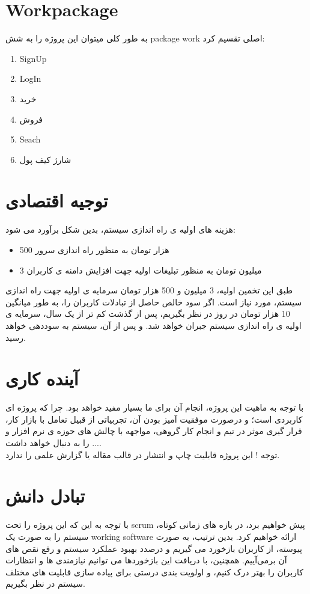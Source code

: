 \documentclass{article}
\begin{document}
	\section{Workpackage}
	به طور کلی میتوان این پروژه را به شش package work اصلی تقسیم کرد:
	\begin{enumerate}
		\item SignUp
		\item LogIn
		\item خرید
		\item فروش
		\item Seach
		\item شارژ کیف پول
	\end{enumerate}
	
	\section{توجیه اقتصادی}
	هزینه های اولیه ی راه اندازی سیستم، بدین شکل برآورد می شود:
	\begin{itemize}
		\item 500 هزار تومان به منظور راه اندازی سرور
		\item 3 میلیون تومان به منظور تبلیغات اولیه جهت افزایش دامنه ی کاربران
	\end{itemize}
	
	طبق این تخمین اولیه، 3 میلیون و 500 هزار تومان سرمایه ی اولیه جهت راه اندازی سیستم، مورد نیاز است. اگر سود خالص حاصل از تبادلات کاربران را، به طور میانگین 10 هزار تومان در روز در نظر بگیریم، پس از گذشت کم تر از یک سال، سرمایه ی اولیه ی راه اندازی سیستم جبران خواهد شد. و پس از آن، سیستم به سوددهی خواهد رسید.
	
	\section{آینده کاری}
	با توجه به ماهیت این پروژه، انجام آن برای ما بسیار مفید خواهد بود. چرا که پروژه ای کاربردی است؛ و درصورت موفقیت آمیز بودن آن، تجربیاتی از قبیل تعامل با بازار کار، قرار گیری موثر در تیم و انجام کار گروهی، مواجهه با چالش های حوزه ی نرم افزار و ... را به دنبال خواهد داشت.\\
	توجه ! این پروژه قابلیت چاپ و انتشار در قالب مقاله یا گزارش علمی را ندارد.
	
	\section{تبادل دانش}
	با توجه به این که این پروژه را تحت scrum پیش خواهیم برد، در بازه های زمانی کوتاه، سیستم را به صورت یک working software ارائه خواهیم کرد. بدین ترتیب، به صورت پیوسته، از کاربران بازخورد می گیریم و درصدد بهبود عملکرد سیستم و رفع نقص های آن برمی‌آییم. همچنین، با دریافت این بازخورد‌ها می توانیم نیازمندی ها و انتظارات کاربران را بهتر درک کنیم، و اولویت بندی درستی برای پیاده سازی قابلیت های مختلف سیستم در نظر بگیریم.
	
\end{document}
